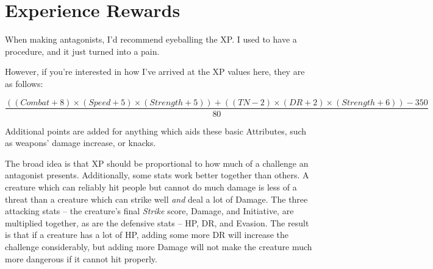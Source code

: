 \chapter{Experience Rewards}

When making antagonists, I'd recommend eyeballing the XP.  I used to have a procedure, and it just turned into a pain.

However, if you're interested in how I've arrived at the XP values here, they are as follows:

\begin{equation}
\frac{(( Combat + 8 ) \times ( Speed + 5) \times ( Strength + 5 ) ) + ( ( TN -2 ) \times ( DR + 2 ) \times ( Strength + 6 )) - 350}{80}
\end{equation}

Additional points are added for anything which aids these basic Attributes, such as weapons' damage increase, or knacks.\label{lastpage}

The broad idea is that XP should be proportional to how much of a challenge an antagonist presents.  Additionally, some stats work better together than others.  A creature which can reliably hit people but cannot do much damage is less of a threat than a creature which can strike well \emph{and} deal a lot of Damage.  The three attacking stats -- the creature's final \textit{Strike} score, Damage, and Initiative, are multiplied together, as are the defensive stats -- HP, DR, and Evasion.  The result is that if a creature has a lot of HP, adding some more DR will increase the challenge considerably, but adding more Damage will not make the creature much more dangerous if it cannot hit properly.

